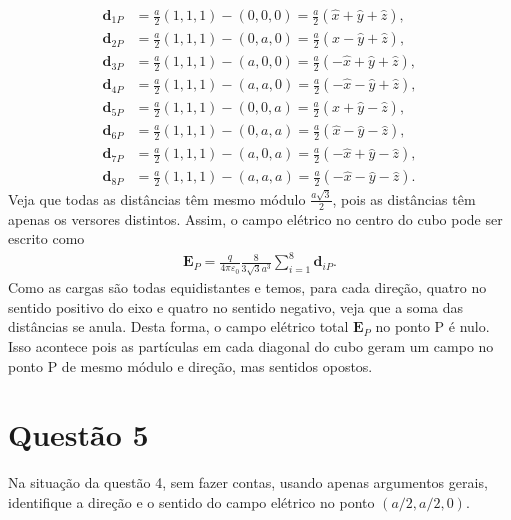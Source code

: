 \documentclass[11pt]{article}
\begin{document}
\begin{align*}
  \mathbf{d}_{1P} &= \frac a2(1,1,1) - (0,0,0)
                    = \frac a2(\hat x+\hat y+\hat z),\\
  \mathbf{d}_{2P} &= \frac a2(1,1,1) - (0,a,0)
                    = \frac a2(\hat x-\hat y+\hat z),\\
  \mathbf{d}_{3P} &= \frac a2(1,1,1) - (a,0,0)
                    = \frac a2(-\hat x+\hat y+\hat z),\\
  \mathbf{d}_{4P} &= \frac a2(1,1,1) - (a,a,0)
                    = \frac a2(-\hat x-\hat y+\hat z),\\
  \mathbf{d}_{5P} &= \frac a2(1,1,1) - (0,0,a)
                    = \frac a2(\hat x+\hat y-\hat z),\\
  \mathbf{d}_{6P} &= \frac a2(1,1,1) - (0,a,a)
                    = \frac a2(\hat x-\hat y-\hat z),\\
  \mathbf{d}_{7P} &= \frac a2(1,1,1) - (a,0,a)
                    = \frac a2(-\hat x+\hat y-\hat z),\\
  \mathbf{d}_{8P} &= \frac a2(1,1,1) - (a,a,a)
                    = \frac a2(-\hat x-\hat y-\hat z).
\end{align*}
Veja que todas as distâncias têm mesmo módulo \(\frac{a\sqrt3}2\), pois as
distâncias têm apenas os versores distintos. Assim, o campo elétrico no
centro do cubo pode ser escrito como
\begin{align*}
  \mathbf{E}_P = \frac{q}{4\pi\varepsilon_0} \frac{8}{3\sqrt3a^3}\sum_{i=1}^8 \mathbf{d}_{iP}.
\end{align*}
Como as cargas são todas equidistantes e temos, para cada
direção, quatro no sentido positivo do eixo e quatro no sentido
negativo, veja que a soma das distâncias se anula. Desta forma, o campo
elétrico total \(\mathbf E_P\) no ponto P é nulo. Isso acontece pois as
partículas em cada diagonal do cubo geram um campo no ponto P de mesmo
módulo e direção, mas sentidos opostos.

\section{Questão 5}
\label{sec:orgd044cda}
Na situação da questão 4, sem fazer contas, usando apenas argumentos
gerais, identifique a direção e o sentido do campo elétrico no ponto
\((a/2,a/2,0)\). 
\end{document}
